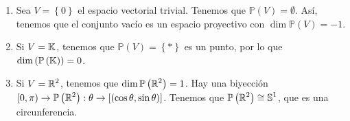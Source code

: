 \begin{eg}
\begin{enumerate}
	\item Sea $\displaystyle V = \left\{ 0\right\}  $ el espacio vectorial trivial. Tenemos que $\displaystyle \mathbb{P}\left(V\right) = \emptyset $. Así, tenemos que el conjunto vacío es un espacio proyectivo con $\displaystyle \dim\mathbb{P}\left(V\right) = -1 $.
	\item Si $\displaystyle V = \mathbb{K} $, tenemos que $\displaystyle \mathbb{P}\left(V\right) = \left\{ *\right\}  $ es un punto, por lo que $\displaystyle \dim\left(\mathbb{P}\left(\mathbb{K}\right)\right) = 0 $.
	\item Si $\displaystyle V = \mathbb{R}^{2} $, tenemos que $\displaystyle \dim\mathbb{P}\left(\mathbb{R}^{2}\right) = 1 $. Hay una biyección $\displaystyle [0,\pi) \to \mathbb{P}\left(\mathbb{R}^{2}\right) : \theta \to [\left(\cos\theta, \sin \theta\right)] $. Tenemos que $\displaystyle \mathbb{P}\left(\mathbb{R}^{2}\right) \cong \mathbb{S}^{1}$, que es una circunferencia.
\end{enumerate}
\end{eg}

